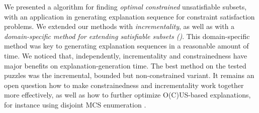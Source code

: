 We presented a \hitsetbased algorithm for finding \textit{optimal constrained} unsatisfiable subsets, with an application in generating explanation sequence for constraint satisfaction problems.
We extended our methods with \emph{incrementality}, as well as with a \emph{domain-specific method for extending satisfiable subsets (\grow)}. 
This domain-specific \grow method was key to generating explanation sequences in a reasonable amount of time.
We noticed that, independently, incrementality and constrainedness have major benefits on explanation-generation time. The best method on the tested puzzles was the incremental, bounded but non-constrained variant. 
It remains an open question how to make constrainedness and incrementality work together more effectively, as well as how to further optimize O(C)US-based explanations, for instance using disjoint MCS enumeration \cite{marques2020reasoning}.



